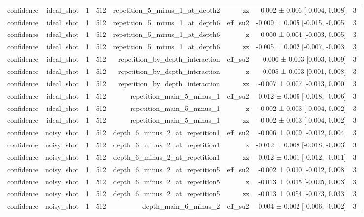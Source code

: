 \begin{table}
\begin{tabular}{lrrrrrrr}
confidence & ideal\_shot & 1 & 512 & repetition\_5\_minus\_1\_at\_depth2 & zz & 0.002 ± 0.006 [-0.004, 0.008] & 3 \\
confidence & ideal\_shot & 1 & 512 & repetition\_5\_minus\_1\_at\_depth6 & eff\_su2 & -0.009 ± 0.005 [-0.015, -0.005] & 3 \\
confidence & ideal\_shot & 1 & 512 & repetition\_5\_minus\_1\_at\_depth6 & z & 0.000 ± 0.004 [-0.003, 0.005] & 3 \\
confidence & ideal\_shot & 1 & 512 & repetition\_5\_minus\_1\_at\_depth6 & zz & -0.005 ± 0.002 [-0.007, -0.003] & 3 \\
confidence & ideal\_shot & 1 & 512 & repetition\_by\_depth\_interaction & eff\_su2 & 0.006 ± 0.003 [0.003, 0.009] & 3 \\
confidence & ideal\_shot & 1 & 512 & repetition\_by\_depth\_interaction & z & 0.005 ± 0.003 [0.001, 0.008] & 3 \\
confidence & ideal\_shot & 1 & 512 & repetition\_by\_depth\_interaction & zz & -0.007 ± 0.007 [-0.013, 0.000] & 3 \\
confidence & ideal\_shot & 1 & 512 & repetition\_main\_5\_minus\_1 & eff\_su2 & -0.012 ± 0.006 [-0.018, -0.006] & 3 \\
confidence & ideal\_shot & 1 & 512 & repetition\_main\_5\_minus\_1 & z & -0.002 ± 0.003 [-0.004, 0.002] & 3 \\
confidence & ideal\_shot & 1 & 512 & repetition\_main\_5\_minus\_1 & zz & -0.002 ± 0.003 [-0.004, 0.002] & 3 \\
confidence & noisy\_shot & 1 & 512 & depth\_6\_minus\_2\_at\_repetition1 & eff\_su2 & -0.006 ± 0.009 [-0.012, 0.004] & 3 \\
confidence & noisy\_shot & 1 & 512 & depth\_6\_minus\_2\_at\_repetition1 & z & -0.012 ± 0.008 [-0.018, -0.003] & 3 \\
confidence & noisy\_shot & 1 & 512 & depth\_6\_minus\_2\_at\_repetition1 & zz & -0.012 ± 0.001 [-0.012, -0.011] & 3 \\
confidence & noisy\_shot & 1 & 512 & depth\_6\_minus\_2\_at\_repetition5 & eff\_su2 & -0.002 ± 0.010 [-0.012, 0.008] & 3 \\
confidence & noisy\_shot & 1 & 512 & depth\_6\_minus\_2\_at\_repetition5 & z & -0.013 ± 0.015 [-0.025, 0.003] & 3 \\
confidence & noisy\_shot & 1 & 512 & depth\_6\_minus\_2\_at\_repetition5 & zz & -0.013 ± 0.054 [-0.073, 0.033] & 3 \\
confidence & noisy\_shot & 1 & 512 & depth\_main\_6\_minus\_2 & eff\_su2 & -0.004 ± 0.002 [-0.006, -0.002] & 3 \\

\end{tabular}
\end{table}
